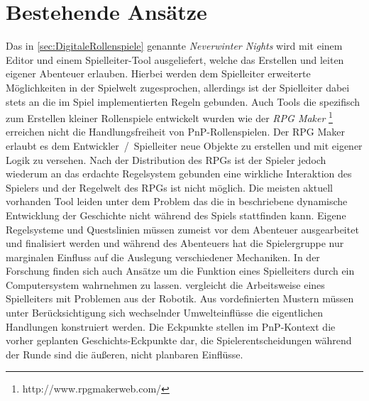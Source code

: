 \section{Bestehende Ansätze}
\label{sec:BekannteAnsaetze}

Das in \ref{sec:DigitaleRollenspiele} genannte \emph{Neverwinter Nights} wird mit einem Editor und einem Spielleiter-Tool ausgeliefert, welche das Erstellen und leiten eigener Abenteuer erlauben. Hierbei werden dem Spielleiter erweiterte Möglichkeiten in der Spielwelt zugesprochen, allerdings ist der Spielleiter dabei stets an die im Spiel implementierten Regeln gebunden. \cite{Tychsen2006a}\newline
Auch Tools die spezifisch zum Erstellen kleiner Rollenspiele entwickelt wurden wie der \emph{RPG Maker} \footnote{http://www.rpgmakerweb.com/} erreichen nicht die Handlungsfreiheit von PnP-Rollenspielen. Der RPG Maker erlaubt es dem Entwickler~/~Spielleiter neue Objekte zu erstellen und mit eigener Logik zu versehen. Nach der Distribution des RPGs ist der Spieler jedoch wiederum an das erdachte Regelsystem gebunden eine wirkliche Interaktion des Spielers und der Regelwelt des RPGs ist nicht möglich.\newline
Die meisten aktuell vorhanden Tool leiden unter dem Problem das die in \cite{Arinbjarnar} beschriebene dynamische Entwicklung der Geschichte nicht während des Spiels stattfinden kann. Eigene Regelsysteme und Questslinien müssen zumeist vor dem Abenteuer ausgearbeitet und finalisiert werden und während des Abenteuers hat die Spielergruppe nur marginalen Einfluss auf die Auslegung verschiedener Mechaniken.\newline
In der Forschung finden sich auch Ansätze um die Funktion eines Spielleiters durch ein Computersystem wahrnehmen zu lassen. \cite{Aylett2007} vergleicht die Arbeitsweise eines Spielleiters mit Problemen aus der Robotik. Aus vordefinierten Mustern müssen unter Berücksichtigung sich wechselnder Umwelteinflüsse die eigentlichen Handlungen konstruiert werden. Die Eckpunkte stellen im PnP-Kontext die vorher geplanten Geschichts-Eckpunkte dar, die Spielerentscheidungen während der Runde sind die äußeren, nicht planbaren Einflüsse.\newline
